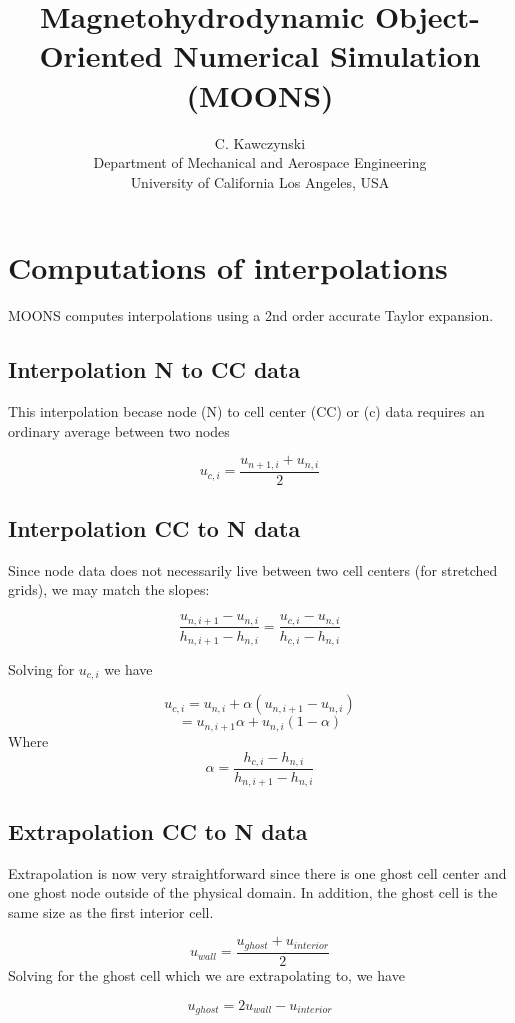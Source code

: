\documentclass[11pt]{article}
\begin{document}
\doublespacing
\title{Magnetohydrodynamic Object-Oriented Numerical Simulation (MOONS)}
\author{C. Kawczynski \\
Department of Mechanical and Aerospace Engineering \\
University of California Los Angeles, USA\\
}
\maketitle

\section{Computations of interpolations}
MOONS computes interpolations using a 2nd order accurate Taylor expansion.

\subsection{Interpolation N to CC data}
This interpolation becase node (N) to cell center (CC) or (c) data requires an ordinary average between two nodes

\begin{equation}
	u_{c,i} = \frac{u_{n+1,i}+u_{n,i}}{2}
\end{equation}

\subsection{Interpolation CC to N data}
Since node data does not necessarily live between two cell centers (for stretched grids), we may match the slopes:

\begin{equation}
	\frac{u_{n,i+1}-u_{n,i}}{h_{n,i+1}-h_{n,i}} =
	\frac{u_{c,i}-u_{n,i}}{h_{c,i}-h_{n,i}}
\end{equation}

Solving for $u_{c,i}$ we have

\begin{equation}
	u_{c,i} = u_{n,i} + \alpha (u_{n,i+1}-u_{n,i})
\end{equation}
\begin{equation}
	= u_{n,i+1}\alpha + u_{n,i}(1-\alpha)
\end{equation}
Where
\begin{equation}
	\alpha = \frac{h_{c,i}-h_{n,i}}{h_{n,i+1}-h_{n,i}}
\end{equation}

\subsection{Extrapolation CC to N data}
Extrapolation is now very straightforward since there is one ghost cell center and one ghost node outside of the physical domain. In addition, the ghost cell is the same size as the first interior cell.

\begin{equation}
	u_{wall} = \frac{u_{ghost} + u_{interior}}{2}
\end{equation}
Solving for the ghost cell which we are extrapolating to, we have

\begin{equation}
	u_{ghost} = 2u_{wall} - u_{interior}
\end{equation}
\end{document}
